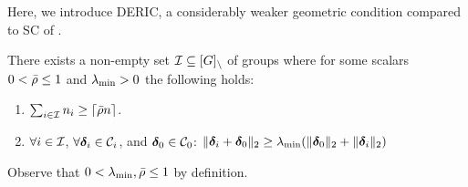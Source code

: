 %
%


Here, we introduce DERIC, a considerably weaker geometric condition compared to SC of \cite{guba16, mctr13}. 
\begin{definition}  \label{incodef}
	There exists a non-empty set $\cI\subseteq \Gsm$ of groups where for some scalars $0 < \bar{\rho}\leq 1$ and $\lambda_{\min}>0$ the following holds:
	\begin{enumerate}
		\item $\sum_{i\in \cI} n_i\geq \lceil \ratio n\rceil$.
		\item $\forall i \in \cI$, $\forall \ddelta_i \in \cC_i$, and $\ddelta_0\in\cC_0$: $\|\boldsymbol{\delta}_i+\boldsymbol{\delta}_0\|_{2}\geq \lambda_{\min} (\|\boldsymbol{\delta}_0\|_{2}+\|\boldsymbol{\delta}_i\|_{2})$
	\end{enumerate}
	Observe that $0 < \lambda_{\min},\bar{\rho}\leq 1$ by definition.
\end{definition}



